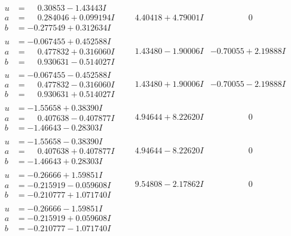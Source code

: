 \documentclass[1p]{elsarticle_modified}
\theoremstyle{definition}
\begin{document}
$$\begin{array}{c|c|c}
\begin{aligned}
u &= \phantom{-}0.30853 - 1.43443 I \\
a &= \phantom{-}0.284046 + 0.099194 I \\
b &= -0.277549 + 0.312634 I\end{aligned}
 & \phantom{-}4.40418 + 4.79001 I & \phantom{-0.000000 } 0 \\ \hline\begin{aligned}
u &= -0.067455 + 0.452588 I \\
a &= \phantom{-}0.477832 + 0.316060 I \\
b &= \phantom{-}0.930631 - 0.514027 I\end{aligned}
 & \phantom{-}1.43480 - 1.90006 I & -0.70055 + 2.19888 I \\ \hline\begin{aligned}
u &= -0.067455 - 0.452588 I \\
a &= \phantom{-}0.477832 - 0.316060 I \\
b &= \phantom{-}0.930631 + 0.514027 I\end{aligned}
 & \phantom{-}1.43480 + 1.90006 I & -0.70055 - 2.19888 I \\ \hline\begin{aligned}
u &= -1.55658 + 0.38390 I \\
a &= \phantom{-}0.407638 - 0.407877 I \\
b &= -1.46643 - 0.28303 I\end{aligned}
 & \phantom{-}4.94644 + 8.22620 I & \phantom{-0.000000 } 0 \\ \hline\begin{aligned}
u &= -1.55658 - 0.38390 I \\
a &= \phantom{-}0.407638 + 0.407877 I \\
b &= -1.46643 + 0.28303 I\end{aligned}
 & \phantom{-}4.94644 - 8.22620 I & \phantom{-0.000000 } 0 \\ \hline\begin{aligned}
u &= -0.26666 + 1.59851 I \\
a &= -0.215919 - 0.059608 I \\
b &= -0.210777 + 1.071740 I\end{aligned}
 & \phantom{-}9.54808 - 2.17862 I & \phantom{-0.000000 } 0 \\ \hline\begin{aligned}
u &= -0.26666 - 1.59851 I \\
a &= -0.215919 + 0.059608 I \\
b &= -0.210777 - 1.071740 I\end{aligned}

\end{array}$$
\end{document}
